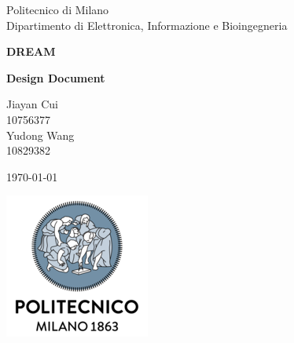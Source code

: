 \documentclass[10pt,english, openany]{book}
\begin{document}

\begin{titlepage}
	\clearpage\thispagestyle{empty}
	\centering
	\vspace{1cm}

	{\normalsize Politecnico di Milano\\
	             Dipartimento di Elettronica, Informazione e Bioingegneria \par}
		\vspace{2cm}
	{\Huge \textbf{DREAM}
	} \\
	{\large \textbf{Design Document} \par}
	\vspace{4cm}
	{\normalsize Jiayan Cui\\
	             10756377\\
	             Yudong Wang\\ 
                 10829382\\
                 \par}
	\vspace{5cm}
	
	{\normalsize \today \par}
	
	\vspace{0.5cm}
    
    \centering \includegraphics[scale=0.6]{logo1.png}
    
    
	\pagebreak

\end{titlepage}

\tableofcontents{}

\mainmatter
\end{document}
